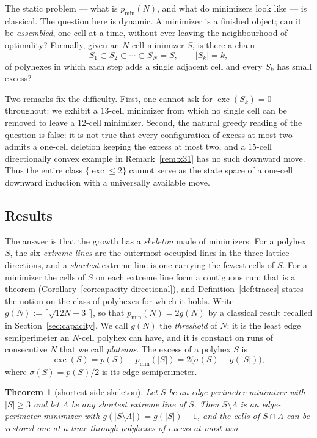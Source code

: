 \documentclass[11pt]{article}
\theoremstyle{plain}
\newtheorem{theorem}{Theorem}[section]
\theoremstyle{definition}
\theoremstyle{remark}
\newcommand{\sm}{\setminus}
\DeclareMathOperator{\exc}{exc}
\begin{document}
The static problem --- what is \(p_{\min}(N)\), and what do minimizers look like --- is
classical. The question here is dynamic. A minimizer is a finished object; can it be
\emph{assembled}, one cell at a time, without ever leaving the neighbourhood of optimality?
Formally, given an \(N\)-cell minimizer \(S\), is there a chain
\[
   S_{1}\subset S_{2}\subset\cdots\subset S_{N}=S,\qquad |S_{k}|=k,
\]
of polyhexes in which each step adds a single adjacent cell and every \(S_{k}\) has small
excess?

Two remarks fix the difficulty. First, one cannot ask for \(\exc(S_{k})=0\) throughout: we
exhibit a \(13\)-cell minimizer from which no single cell can be removed to leave a
\(12\)-cell minimizer. Second, the natural greedy reading of the question is false: it is
not true that every configuration of excess at most two admits a one-cell deletion keeping
the excess at most two, and a \(15\)-cell directionally convex example in
Remark~\ref{rem:x31} has no such downward move. Thus the entire class \(\{\exc\le2\}\)
cannot serve as the state space of a one-cell downward induction with a universally
available move.

\subsection{Results}\label{sec:0.2}

The answer is that the growth has a \emph{skeleton} made of minimizers. For a polyhex \(S\),
the six \emph{extreme lines} are the outermost occupied lines in the three lattice
directions, and a \emph{shortest} extreme line is one carrying the fewest cells of \(S\).
For a minimizer the cells of \(S\) on each extreme line form a contiguous run; that is a
theorem (Corollary~\ref{cor:capacity-directional}), and Definition~\ref{def:traces} states the notion
on the class of polyhexes for which it holds. Write \(g(N):=\lceil\sqrt{12N-3}\,\rceil\),
so that \(p_{\min}(N)=2g(N)\) by a classical result recalled in
Section~\ref{sec:capacity}. We call \(g(N)\) the \emph{threshold} of \(N\): it is the
least edge semiperimeter an \(N\)-cell polyhex can have, and it is constant on runs of
consecutive \(N\) that we call \emph{plateaus}. The excess of a polyhex \(S\) is
\[
   \exc(S)=p(S)-p_{\min}(|S|)=2\bigl(\sigma(S)-g(|S|)\bigr),
\]
where \(\sigma(S)=p(S)/2\) is its edge semiperimeter.

\begin{theorem}[shortest-side skeleton]\label{thm:intro-skel}
Let \(S\) be an edge-perimeter minimizer with \(|S|\ge3\) and let \(\Lambda\) be any
shortest extreme line of \(S\). Then \(S\sm\Lambda\) is an edge-perimeter minimizer with
\(g(|S\sm\Lambda|)=g(|S|)-1\), and the cells of \(S\cap\Lambda\) can be restored one at a
time through polyhexes of excess at most two.
\end{theorem}
\end{document}
